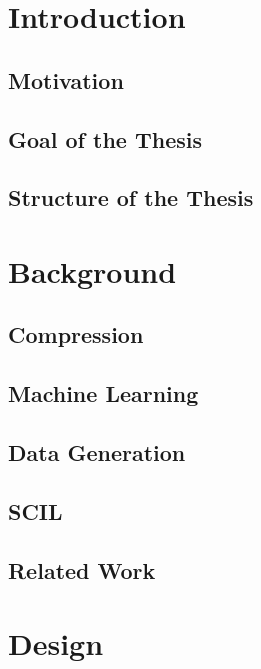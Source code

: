 \documentclass[
	12pt,
	a4paper,
	BCOR10mm,
	DIV14,
	headsepline,
]{scrreprt}
\begin{document}
\tableofcontents

\chapter{Introduction}
\label{c:intro}

\section{Motivation}
\label{s:mot}

\section{Goal of the Thesis}
\label{s:gott}

\section{Structure of the Thesis}
\label{s:sott}

\chapter{Background}
\label{c:bg}

\section{Compression}
\label{s:comp}

\section{Machine Learning}
\label{s:ml}

\section{Data Generation}
\label{s:dg}

\section{SCIL}
\label{s:scil}

\section{Related Work}
\label{s:rw}

\chapter{Design}
\label{c:des}
\end{document}
